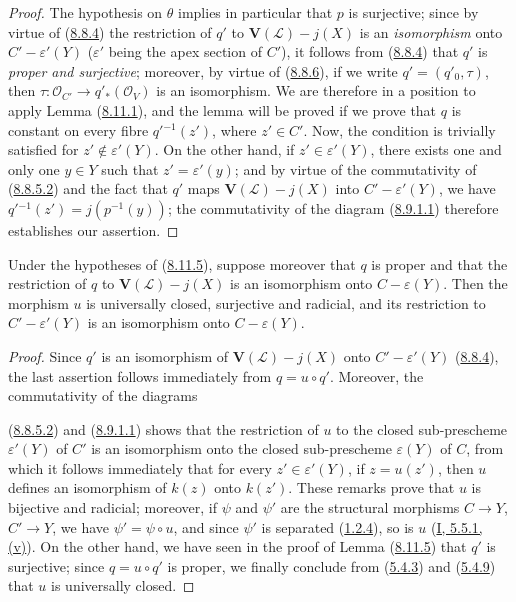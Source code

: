 \begin{proof}
The hypothesis on $\theta$ implies in particular that $p$ is surjective;
since by virtue of (\hyperref[II.8.8.4]{8.8.4}) the restriction of $q'$ to
$\mathbf{V}(\mathcal{L})-j(X)$ is an \emph{isomorphism} onto
$C'-\varepsilon'(Y)$ ($\varepsilon'$ being the apex section of $C'$), it
follows from (\hyperref[II.8.8.4]{8.8.4}) that $q'$ is \emph{proper and
surjective}; moreover, by virtue of (\hyperref[II.8.8.6]{8.8.6}), if we write
$q'=(q'_0,\tau)$, then
$\tau:\mathcal{O}_{C'}\to q'_*(\mathcal{O}_V)$ is an isomorphism. We are
therefore in a position to apply Lemma
(\hyperref[II.8.11.1]{8.11.1}), and the lemma will be proved if we prove
that $q$ is constant on every fibre $q'{}^{-1}(z')$, where $z'\in C'$. Now, the
condition is trivially satisfied for $z'\notin\varepsilon'(Y)$. On the other
hand, if $z'\in\varepsilon'(Y)$, there exists one and only one $y\in Y$ such
that $z'=\varepsilon'(y)$; and by virtue of the commutativity of
(\hyperref[II.8.8.5.2]{8.8.5.2}) and the fact that $q'$ maps
$\mathbf{V}(\mathcal{L})-j(X)$ into $C'-\varepsilon'(Y)$, we have
$q'{}^{-1}(z')=j(p^{-1}(y))$; the commutativity of the diagram
(\hyperref[II.8.9.1.1]{8.9.1.1}) therefore establishes our assertion.
\end{proof}

\begin{corollary}[8.11.6]
\label{II.8.11.6}
Under the hypotheses of (\hyperref[II.8.11.5]{8.11.5}), suppose moreover
that $q$ is proper and that the restriction of $q$ to
$\mathbf{V}(\mathcal{L})-j(X)$ is an isomorphism onto
$C-\varepsilon(Y)$. Then the morphism $u$ is universally closed,
surjective and radicial, and its restriction to $C'-\varepsilon'(Y)$ is an
isomorphism onto $C-\varepsilon(Y)$.
\end{corollary}

\begin{proof}
Since $q'$ is an isomorphism of $\mathbf{V}(\mathcal{L})-j(X)$ onto
$C'-\varepsilon'(Y)$ (\hyperref[II.8.8.4]{8.8.4}), the last assertion
follows immediately from $q=u\circ q'$. Moreover, the commutativity of the
diagrams

(\hyperref[II.8.8.5.2]{8.8.5.2}) and
(\hyperref[II.8.9.1.1]{8.9.1.1}) shows that the restriction of $u$ to the
closed sub-prescheme $\varepsilon'(Y)$ of $C'$ is an isomorphism onto the
closed sub-prescheme $\varepsilon(Y)$ of $C$, from which it follows
immediately that for every $z'\in\varepsilon'(Y)$, if $z=u(z')$, then $u$
defines an isomorphism of $k(z)$ onto $k(z')$. These remarks prove that $u$
is bijective and radicial; moreover, if $\psi$ and $\psi'$ are the structural
morphisms $C\to Y$, $C'\to Y$, we have $\psi'=\psi\circ u$, and since $\psi'$
is separated (\hyperref[II.1.2.4]{1.2.4}), so is $u$
(\hyperref[I.5.5.1]{I, 5.5.1, (v)}). On the other hand, we have seen in the
proof of Lemma (\hyperref[II.8.11.5]{8.11.5}) that $q'$ is
surjective; since $q=u\circ q'$ is proper, we finally conclude from
(\hyperref[II.5.4.3]{5.4.3}) and (\hyperref[II.5.4.9]{5.4.9}) that $u$
is universally closed.
\end{proof}


